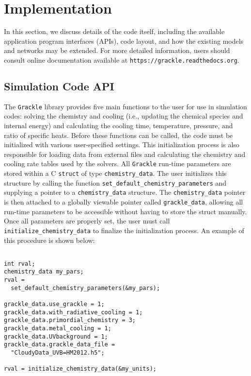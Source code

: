 \section{Implementation} \label{methods:code}

In this section, we discuss details of the code itself, including the
available application program interfaces (APIs), code layout, and how
the existing models and networks may be extended.  For more detailed
information, users should consult online documentation available at
\texttt{https://grackle.readthedocs.org}.

\subsection{Simulation Code API}

The \texttt{Grackle} library provides five main functions to the user for use
in simulation codes: solving the chemistry and cooling (i.e.,
updating the chemical species and internal energy) and calculating the
cooling time, temperature, pressure, and ratio of specific heats.
Before these functions can be called, the code must be initialized
with various user-specified settings.  This initialization process is
also responsible for loading data from external files and calculating
the chemistry and cooling rate tables used by the solvers.  All
\texttt{Grackle} run-time parameters are stored within a C \texttt{struct} of type
\texttt{chemistry\_data}.  The user initializes this structure by
calling the function \texttt{set\_default\_chemistry\_parameters}
and supplying a pointer to a \texttt{chemistry\_data} structure.  The
\texttt{chemistry\_data} pointer is then attached to a globally
viewable pointer called \texttt{grackle\_data}, allowing all run-time
parameters to be accessible without having to store the struct
manually.  Once all parameters are properly set, the user must call
\texttt{initialize\_chemistry\_data} to finalize the initialization
process.  An example of this procedure is shown below:

\vspace{0.5cm}
\begin{minipage}[b]{0.5\linewidth}
\begin{verbatim}

int rval;
chemistry_data my_pars;
rval =
  set_default_chemistry_parameters(&my_pars);

grackle_data.use_grackle = 1;
grackle_data.with_radiative_cooling = 1;
grackle_data.primordial_chemistry = 3;
grackle_data.metal_cooling = 1;
grackle_data.UVbackground = 1;
grackle_data.grackle_data_file = 
  "CloudyData_UVB=HM2012.h5";

rval = initialize_chemistry_data(&my_units);

\end{verbatim}
\end{minipage}

